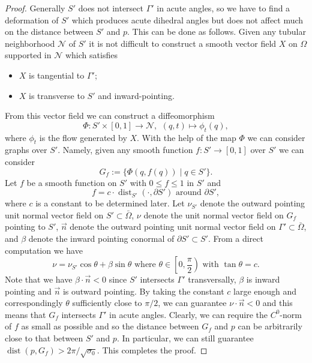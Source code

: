 \documentclass[11pt,letterpaper]{amsart}
\numberwithin{equation}{section}
\theoremstyle{definition}
\DeclareMathOperator{\dist}{dist}
\begin{document}
\begin{proof}
Generally $S'$ does not intersect $\Gamma'$ in acute angles, so we have to find a deformation of $S'$ which produces acute dihedral angles but does not affect much on the distance between $S'$ and $p$. This can be done as follows. Given any tubular neighborhood $\mathcal N$ of $S'$ it is not difficult to construct a smooth vector field $X$ on $\Omega$ supported in $\mathcal N$ which satisfies
\begin{itemize}\setlength{\itemsep}{1mm}
\item $X$ is tangential to $\Gamma'$;
\item $X$ is transverse to $S'$ and inward-pointing.
\end{itemize}
From this vector field we can construct a diffeomorphism
$$
\Phi:S'\times [0,1] \to \mathcal N,\ \, (q,t)\mapsto \phi_t(q),
$$
where $\phi_t$ is the flow generated by $X$. {With the help of the map $\Phi$ we can consider graphs over $S'$. Namely, given any smooth function $f:S'\to [0,1]$ over $S'$ we can consider
$$
G_f:= \big\{\Phi(q,f(q)) \mid q\in S'\big\}.
$$
Let $f$ be a smooth function on $S'$ with $0\leq f\leq 1$ in $S'$ and
$$
f = c \cdot \dist_{S'}(\cdot,\partial S')  \mbox{ around }\partial S',
$$
where $c$ is a constant to be determined later. Let $\nu_{S'}$ denote the outward pointing unit normal vector field on $S'\subset \bar\Omega$, $\nu$ denote the unit normal vector field on $G_f$ pointing to $S'$, $\vec n$ denote the outward pointing unit normal vector field on $\Gamma'\subset \bar\Omega$, and $\beta$ denote the inward pointing conormal of $\partial S'\subset S'$. From a direct  computation we have
$$
\text{$\nu=\nu_{S'}\cos\theta+\beta\sin\theta$ where $\theta\in\left[0,\frac{\pi}{2}\right)$ with $\tan\theta=c$.}
$$
Note that we have $\beta\cdot \vec n<0$ since $S'$ intersects $\Gamma'$ transversally, $\beta$ is inward pointing and $\vec n$ is outward pointing. By taking the constant $c$ large enough and correspondingly $\theta$ sufficiently close to $\pi/2$, we can guarantee $\nu\cdot \vec n<0$ and this means that $G_f$ intersects $\Gamma'$ in acute angles. Clearly, we can require the $C^0$-norm of $f$ as small as possible and so the distance between $G_f$ and $p$ can be arbitrarily close to that between $S'$ and $p$.
In particular, we can still guarantee $\dist(p,G_f)>2\pi/\sqrt{\sigma_0}$. This completes the proof.}
\end{proof}
\end{document}
